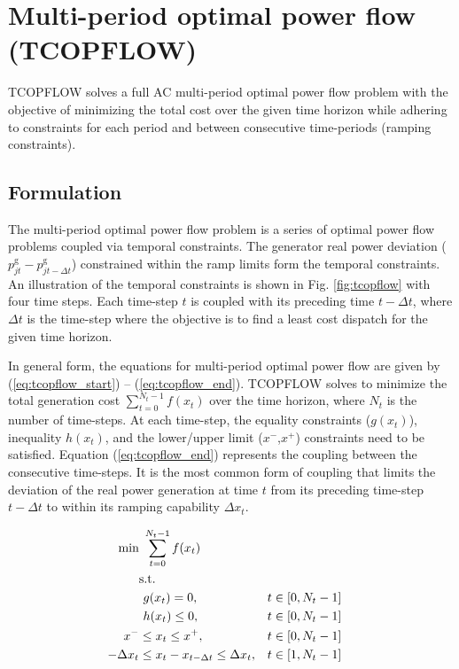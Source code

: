 \chapter{Multi-period optimal power flow (TCOPFLOW)}\label{chap:tcopflow}

TCOPFLOW solves a full AC multi-period optimal power flow problem with the objective of minimizing the total cost over the given time horizon while adhering to constraints for each period and between consecutive time-periods (ramping constraints). 

\section{Formulation}
The multi-period optimal power flow problem is a series of optimal power flow problems coupled via temporal constraints. The generator real power deviation ($p_{jt}^{\text{g}} - p_{jt-\Delta{t}}^{\text{g}}$) constrained within the ramp limits form the temporal constraints. An illustration of the temporal constraints is shown in Fig. \ref{fig:tcopflow} with four time steps. Each time-step $t$ is coupled with its preceding time $t-\Delta{t}$, where $\Delta{t}$ is the time-step where the objective is to find a least cost dispatch for the given time horizon.



In general form, the equations for multi-period optimal power flow are given by
(\ref{eq:tcopflow_start}) -- (\ref{eq:tcopflow_end}). TCOPFLOW solves to
minimize the total generation cost $\sum_{t=0}^{N_t-1}f(x_t)$ over the time
horizon, where $N_t$ is the number of time-steps. At each time-step, the
equality constraints ($g(x_t)$), inequality $h(x_t)$, and the lower/upper limit
($x^-$,$x^+$) constraints need to be satisfied. Equation (\ref{eq:tcopflow_end})
represents the coupling between the consecutive time-steps. It is the most
common form of coupling that limits the deviation of the real power generation
at time $t$ from its preceding time-step $t-\Delta{t}$ to within its ramping
capability $\Delta x_t$.


\begin{align}
\centering
\text{min}&~\sum_{t=0}^{N_t-1} f(x_t) &  \label{eq:tcopflow_start}\\
&\text{s.t.}& \nonumber \\
&~g(x_t) = 0,                                        &t \in \left[0,N_t-1\right]& \\
&~h(x_t) \le 0,                                      &t \in \left[0,N_t-1\right]& \\
x^- & \le x_t \le x^+,                               &t\in \left[0,N_t-1\right]& \\
-\Delta x_t & \le x_t - x_{t-\Delta{t}} \le \Delta x_t,&t \in \left[1,N_t-1\right]&
\label{eq:tcopflow_end}
\end{align}

